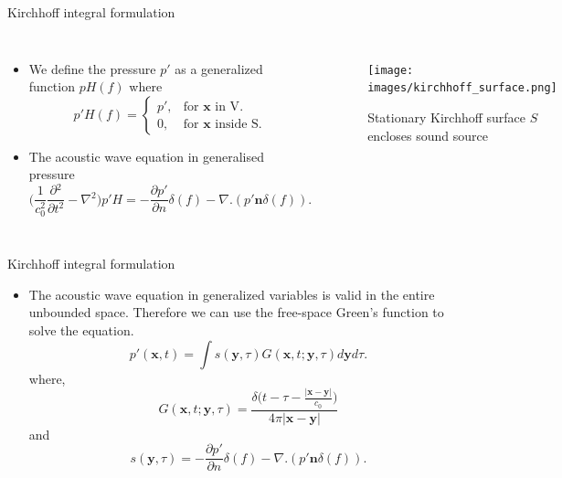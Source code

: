 \documentclass[10pt, aspectratio=169]{beamer}
\begin{document}
\begin{frame}{Kirchhoff integral formulation}
	\begin{columns}
		\begin{itemize}
			\item We define the pressure $p'$ as a generalized function $pH(f)$ where
			\begin{equation*}\label{Generalized_Functions}
				p' H(f) =\begin{cases}
					p' , & \text{for $\mathbf{x}$ in V}.     \\
					0,  & \text{for $\mathbf{x}$ inside S}.
				\end{cases}
			\end{equation*}
			\item The acoustic wave equation in generalised pressure
			\begin{equation*}\label{Generalized Wave Equation}
				\Bigg( \frac{1}{c_{0}^2}\frac{\partial{}^{2}}{\partial{t}^{2}}- \nabla{}^{2} \Bigg) p'H = -\frac{\partial p'}{\partial n}\delta(f) - \nabla.(p' \mathbf{n} \delta(f)).
			\end{equation*}
		\end{itemize}
				
		\begin{figure}[h]
			\texttt{[image: images/kirchhoff\_surface.png]}
			\caption{Stationary Kirchhoff surface $S$ encloses sound source}	
		\end{figure}
							
	\end{columns}
\end{frame}

\begin{frame}{Kirchhoff integral formulation}
	\begin{itemize}
		\item The acoustic wave equation in generalized variables is valid in the
		entire unbounded space. Therefore we can use the free-space Green’s function to
		solve the equation.
		\begin{equation}\label{pressure}
			p'(\mathbf{x}, t) = \int s(\mathbf{y}, \tau){G(\mathbf{x}, t; \mathbf{y}, \tau )} d\mathbf{y}d\tau.
		\end{equation}
		where,
		\begin{equation}\label{Green's Function}
			G(\mathbf{x}, t; \mathbf{y}, \tau ) = \frac{\delta \Big(t - \tau - \frac{|\mathbf{x} - \mathbf{y}|}{c_{0}}\Big)}{4\pi|\mathbf{x} - \mathbf{y}|}
		\end{equation}
		and 
		\begin{equation}
			s(\mathbf{y}, \tau) = -\frac{\partial p'}{\partial n}\delta(f) - \nabla.(p' \mathbf{n} \delta(f)).
		\end{equation}
	\end{itemize}
\end{frame}
\end{document}
